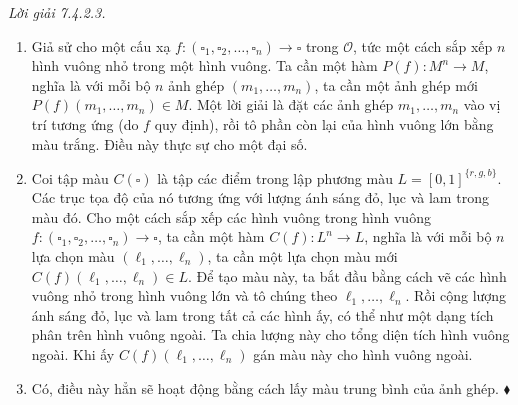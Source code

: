 \noindent\textit{Lời giải 7.4.2.3.}\keepwithnext
\begin{enumerate}[label=\alph*.]
\item Giả sử cho một cấu xạ $f:(\square_1,\square_2,\ldots,\square_n)\to\square$ trong $\mathcal O$, tức một cách sắp xếp $n$ hình vuông nhỏ trong một hình vuông. Ta cần một hàm $P(f):M^n\to M$, nghĩa là với mỗi bộ $n$ ảnh ghép $(m_1,\ldots,m_n)$, ta cần một ảnh ghép mới $P(f)(m_1,\ldots,m_n)\in M$. Một lời giải là đặt các ảnh ghép $m_1,\ldots,m_n$ vào vị trí tương ứng (do $f$ quy định), rồi tô phần còn lại của hình vuông lớn bằng màu trắng. Điều này thực sự cho một đại số.
\item Coi tập màu $C(\square)$ là tập các điểm trong lập phương màu $L=[0,1]^{\{r,g,b\}}$. Các trục tọa độ của nó tương ứng với lượng ánh sáng đỏ, lục và lam trong màu đó. Cho một cách sắp xếp các hình vuông trong hình vuông $f:(\square_1,\square_2,\ldots,\square_n)\to\square$, ta cần một hàm $C(f):L^n\to L$, nghĩa là với mỗi bộ $n$ lựa chọn màu $(\ell_1,\ldots,\ell_n)$, ta cần một lựa chọn màu mới $C(f)(\ell_1,\ldots,\ell_n)\in L$. Để tạo màu này, ta bắt đầu bằng cách vẽ các hình vuông nhỏ trong hình vuông lớn và tô chúng theo $\ell_1,\ldots,\ell_n$. Rồi cộng lượng ánh sáng đỏ, lục và lam trong tất cả các hình ấy, có thể như một dạng tích phân trên hình vuông ngoài. Ta chia lượng này cho tổng diện tích hình vuông ngoài. Khi ấy $C(f)(\ell_1,\ldots,\ell_n)$ gán màu này cho hình vuông ngoài.
\item Có, điều này hẳn sẽ hoạt động bằng cách lấy màu trung bình của ảnh ghép.
\nobreak\hfill$\blacklozenge$
\end{enumerate}

